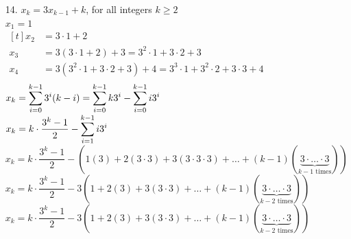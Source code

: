 \documentclass[letterpaper,fleqn,leqno]{article}
\begin{document}
\begin{enumerate}[(a)]
{\begin{enumerate}
				\item [14.]
				$x_k=3x_{k-1}+k$, for all integers $k\geq2$ \\
				$x_1=1$ \\
				$\begin{aligned}[t]
					x_2 &= 3\cdot1+2 \\
					x_3 &= 3(3\cdot1+2)+3 = 3^2\cdot1+3\cdot2+3\\
					x_4 &= 3(3^2\cdot1 + 3\cdot2 + 3)+4 = 3^3\cdot1+3^2\cdot2+3\cdot3+4 \\
				\end{aligned}$ \\
				$x_k=\displaystyle\sum\limits_{i=0}^{k-1}3^i(k-i)=\displaystyle\sum\limits_{i=0}^{k-1}k3^i-\displaystyle\sum\limits_{i=0}^{k-1}i3^i$ \\
				$x_k=k\cdot\dfrac{3^k-1}{2}-\displaystyle\sum\limits_{i=1}^{k-1}i3^i$ \\
				$x_k=k\cdot\dfrac{3^k-1}{2}-\left(1(3)+2(3\cdot3)+3(3\cdot3\cdot3)+\dots+(k-1)(\underbrace{3\cdot{}\dots{}\cdot3}_{\text{$k-1$ times}})\right)$ \\
				$x_k=k\cdot\dfrac{3^k-1}{2}-3\left(1+2(3)+3(3\cdot3)+\dots+(k-1)(\underbrace{3\cdot{}\dots{}\cdot3}_{\text{$k-2$ times}})\right)$ \\
				$x_k=k\cdot\dfrac{3^k-1}{2}-3\left(1+2(3)+3(3\cdot3)+\dots+(k-1)(\underbrace{3\cdot{}\dots{}\cdot3}_{\text{$k-2$ times}})\right)$ \\

\end{enumerate}}
\end{enumerate}
\end{document}
